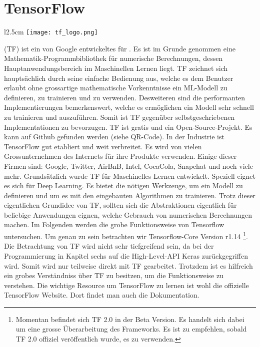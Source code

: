 \section{TensorFlow}\label{sec:tensorflow}
\begin{wrapfigure}{l}{2.5cm}
  \texttt{[image: tf\_logo.png]}
  \caption{TF-Logo}
\end{wrapfigure}
 (TF) ist ein von Google entwickeltes  für
. Es ist im Grunde genommen eine
Mathematik-Programmbibliothek für numerische Berechnungen, dessen Hauptanwendungsbereich im Maschinellen Lernen
liegt. TF zeichnet sich hauptsächlich durch seine einfache Bedienung aus, welche
es dem Benutzer erlaubt ohne grossartige mathematische Vorkenntnisse ein ML-Modell zu definieren,
zu trainieren und zu verwenden. Desweiteren sind die performanten
Implementierungen bemerkenswert, welche es ermöglichen ein Modell sehr schnell
zu trainieren und auszuführen. Somit ist TF gegenüber selbstgeschriebenen
Implementationen zu bevorzugen.
TF ist gratis und ein Open-Source-Projekt. Es kann auf Github gefunden werden
(siehe QR-Code).
\para{}
\para{}
In der Industrie ist TensorFlow gut etabliert und weit verbreitet. Es wird von
vielen Grossunternehmen des Internets für ihre Produkte verwenden. Einige dieser
Firmen sind: Google, Twitter, AirBnB, Intel, CocaCola, Snapchat und noch viele mehr.
\para{}
Grundsätzlich wurde TF für Maschinelles Lernen entwickelt. Speziell eignet es
sich für Deep Learning. Es bietet die nötigen Werkzeuge, um ein Modell zu
definieren und um es mit den eingebauten Algorithmen zu trainieren.
Trotz dieser eigentlichen Grundidee von TF, sollten sich die Abstraktionen eigentlich
für beliebige Anwendungen eignen, welche Gebrauch von numerischen Berechnungen machen.
\para{}
Im Folgenden werden die grobe Funktionsweise von Tensorflow untersuchen. Um
genau zu sein betrachten wir Tensorflow-Core Version r1.14%
\footnote{Momentan befindet sich TF 2.0 in der Beta Version. Es handelt sich
  dabei um eine grosse Überarbeitung des Frameworks. Es ist zu empfehlen, sobald TF 2.0 offiziel
  veröffentlich wurde, es zu verwenden.}.
Die Betrachtung von TF wird nicht sehr tiefgreifend sein, da bei der
Programmierung in Kapitel sechs auf die High-Level-API Keras zurückgegriffen
wird. Somit wird nur teilweise direkt mit TF gearbeitet. Trotzdem ist es hilfreich ein
grobes Verständniss über TF zu besitzen, um die Funktionsweise zu verstehen.
\para{}
Die wichtige Resource um TensorFlow zu lernen ist wohl die offizielle TensorFlow
Website. Dort findet man auch die Dokumentation.
\para{}

